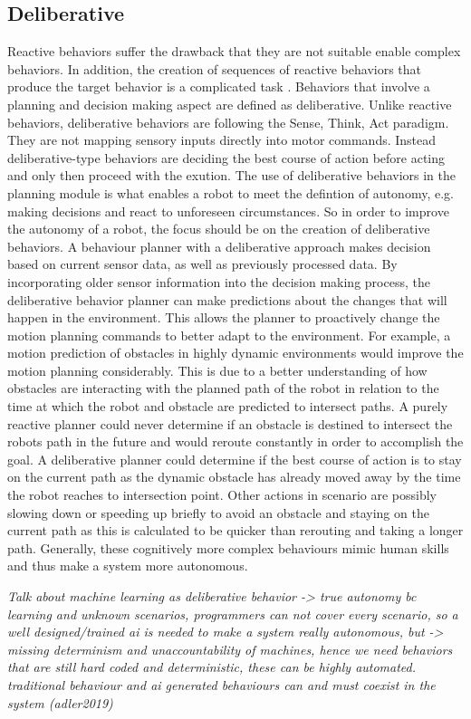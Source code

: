 \subsection{Deliberative}
Reactive behaviors suffer the drawback that they are not suitable enable complex behaviors. In addition, the creation of sequences of reactive behaviors that produce the target behavior is a complicated task \cite{murphy2000}. Behaviors that involve a planning and decision making aspect are defined as deliberative. Unlike reactive behaviors, deliberative behaviors are following the Sense, Think, Act paradigm. They are not mapping sensory inputs directly into motor commands. Instead deliberative-type behaviors are deciding the best course of action before acting and only then proceed with the exution. The use of deliberative behaviors in the planning module is what enables a robot to meet the defintion of autonomy, e.g. making decisions and react to unforeseen circumstances. 
So in order to improve the autonomy of a robot, the focus should be on the creation of deliberative behaviors. A behaviour planner with a deliberative approach makes decision based on current sensor data, as well as previously processed data. By incorporating older sensor information into the decision making process, the deliberative behavior planner can make predictions about the changes that will happen in the environment. This allows the planner to proactively change the motion planning commands to better adapt to the environment. For example, a motion prediction of obstacles in highly dynamic environments would improve the motion planning considerably. This is due to a better understanding of how obstacles are interacting with the planned path of the robot in relation to the time at which the robot and obstacle are predicted to intersect paths. A purely reactive planner could never determine if an obstacle is destined to intersect the robots path in the future and would reroute constantly in order to accomplish the goal. A deliberative planner could determine if the best course of action is to stay on the current path as the dynamic obstacle has already moved away by the time the robot reaches to intersection point. Other actions in scenario are possibly slowing down or speeding up briefly to avoid an obstacle and staying on the current path as this is calculated to be quicker than rerouting and taking a longer path. 
Generally, these cognitively more complex behaviours mimic human skills and thus make a system more autonomous. 

\textit{Talk about machine learning as deliberative behavior -> true autonomy bc learning and unknown scenarios, programmers can not cover every scenario, so a well designed/trained ai is needed to make a system really autonomous, but -> missing determinism and unaccountability of machines, hence we need behaviors that are still hard coded and deterministic, these can be highly automated. traditional behaviour  and ai generated behaviours can and must coexist in the system (adler2019)}

